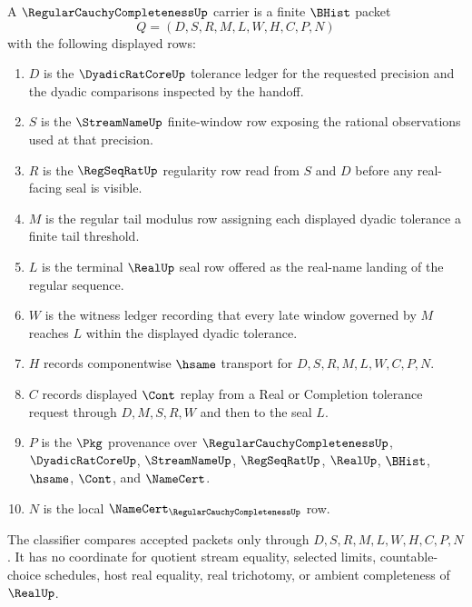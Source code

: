\begin{definition}
\label{def:regular-cauchy-completeness-carrier}
A $\RegularCauchyCompletenessUp$ carrier is a finite $\BHist$ packet
$$
Q=(D,S,R,M,L,W,H,C,P,N)
$$
with the following displayed rows:
\begin{enumerate}
\item $D$ is the $\DyadicRatCoreUp$ tolerance ledger for the requested precision and the dyadic comparisons inspected by the handoff.
\item $S$ is the $\StreamNameUp$ finite-window row exposing the rational observations used at that precision.
\item $R$ is the $\RegSeqRatUp$ regularity row read from $S$ and $D$ before any real-facing seal is visible.
\item $M$ is the regular tail modulus row assigning each displayed dyadic tolerance a finite tail threshold.
\item $L$ is the terminal $\RealUp$ seal row offered as the real-name landing of the regular sequence.
\item $W$ is the witness ledger recording that every late window governed by $M$ reaches $L$ within the displayed dyadic tolerance.
\item $H$ records componentwise $\hsame$ transport for $D,S,R,M,L,W,C,P,N$.
\item $C$ records displayed $\Cont$ replay from a Real or Completion tolerance request through $D,M,S,R,W$ and then to the seal $L$.
\item $P$ is the $\Pkg$ provenance over $\RegularCauchyCompletenessUp$, $\DyadicRatCoreUp$, $\StreamNameUp$, $\RegSeqRatUp$, $\RealUp$, $\BHist$, $\hsame$, $\Cont$, and $\NameCert$.
\item $N$ is the local $\NameCert_{\RegularCauchyCompletenessUp}$ row.
\end{enumerate}
The classifier compares accepted packets only through $D,S,R,M,L,W,H,C,P,N$. It has no coordinate for quotient stream equality, selected limits, countable-choice schedules, host real equality, real trichotomy, or ambient completeness of $\RealUp$.
\end{definition}

